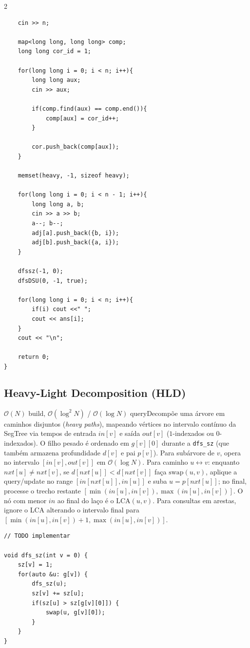 \documentclass[11pt]{article}
\begin{document}
\begin{multicols}{2}
\begin{lstlisting}
    cin >> n;
    
    map<long long, long long> comp;
    long long cor_id = 1;
    
    for(long long i = 0; i < n; i++){
        long long aux;
        cin >> aux;
        
        if(comp.find(aux) == comp.end()){
            comp[aux] = cor_id++;
        }
        
        cor.push_back(comp[aux]);
    }
 
    memset(heavy, -1, sizeof heavy);
 
    for(long long i = 0; i < n - 1; i++){
        long long a, b;
        cin >> a >> b;
        a--; b--;
        adj[a].push_back({b, i});
        adj[b].push_back({a, i});
    }
 
    dfssz(-1, 0);
    dfsDSU(0, -1, true);
 
    for(long long i = 0; i < n; i++){
        if(i) cout <<" ";
        cout << ans[i];
    }
    cout << "\n";
 
    return 0;
}

\end{lstlisting}


\subsection{Heavy-Light Decomposition (HLD)}
$\mathcal{O}(N)$ build, $\mathcal{O}(\log^2 N)$ / $\mathcal{O}(\log N)$ queryDecompõe uma árvore em caminhos disjuntos (\textit{heavy paths}), mapeando vértices no intervalo contínuo da SegTree via tempos de entrada $in[v]$ e saída $out[v]$ ($1$-indexados ou $0$-indexados). O filho pesado é ordenado em $g[v][0]$ durante a \texttt{dfs\_sz} (que também armazena profundidade $d[v]$ e pai $p[v]$). Para subárvore de $v$, opera no intervalo $[in[v], out[v]]$ em $\mathcal{O}(\log N)$. Para caminho $u \leftrightarrow v$: enquanto $nxt[u] \neq nxt[v]$, se $d[nxt[u]] < d[nxt[v]]$ faça $\text{swap}(u, v)$, aplique a query/update no range $[in[nxt[u]], in[u]]$ e suba $u = p[nxt[u]]$; no final, processe o trecho restante $[\min(in[u], in[v]), \max(in[u], in[v])]$. O nó com menor $in$ ao final do laço é o $\text{LCA}(u, v)$. Para consultas em arestas, ignore o LCA alterando o intervalo final para $[\min(in[u], in[v]) + 1, \max(in[u], in[v])]$.
\begin{lstlisting}
// TODO implementar

void dfs_sz(int v = 0) {
    sz[v] = 1;
    for(auto &u: g[v]) {
        dfs_sz(u);
        sz[v] += sz[u];
        if(sz[u] > sz[g[v][0]]) {
            swap(u, g[v][0]);
        }
    }
}


\end{lstlisting}
\end{multicols}
\end{document}
